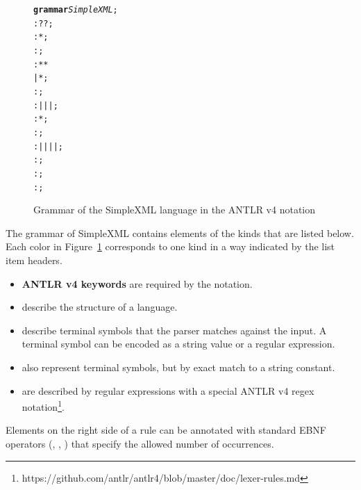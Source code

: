 \begin{figure}[ht]
\vspace{-2mm}
\centering
\begin{alltt}
\small
\textbf{grammar} \textit{SimpleXML};
  : ? ?  ;
    :  *  ;
   : \antlrliteral{<!--}  \antlrliteral{-->} ;
   : \antlrliteral{<}  * \antlrliteral{>} * \antlrliteral{</}  \antlrliteral{>}
          |  \antlrliteral{<}  * \antlrliteral{/>} ;
      :     ;
   :  |  |  |  ;
      :  * ;
     : \antlrregex{[0-9]} ;
  :  | \antlrliteral{-} | \antlrliteral{\_} |  |  ;
  : \antlrregex{[:a-zA-Z]} ;
      : \antlrregex{~[<"]*} ;
     : \antlrliteral{<![CDATA[}  \antlrliteral{]]>} ;
\end{alltt}
\caption{Grammar of the SimpleXML language in the ANTLR v4 notation}
\label{fig:SIMPLEXML}
\vspace{-2mm}
\end{figure}

The grammar of SimpleXML contains elements of the kinds that are listed below.
Each color in Figure~\ref{fig:SIMPLEXML} corresponds to one kind in a way indicated by the list item headers.
\begin{itemize}
	\item \textbf{ANTLR v4 keywords} are required by the notation.
	\item {} describe the structure of a language.
	\item {} describe terminal symbols that the parser matches against the input.
		A terminal symbol can be encoded as a string value or a regular expression.
	\item {} also represent terminal symbols, but by exact match to a string constant.
	\item {} are described by regular expressions with a special ANTLR v4 regex notation\footnote{https://github.com/antlr/antlr4/blob/master/doc/lexer-rules.md}.
\end{itemize}
Elements on the right side of a rule can be annotated with standard EBNF operators (, \code{+}, \code{*}) that specify the allowed number of occurrences.

